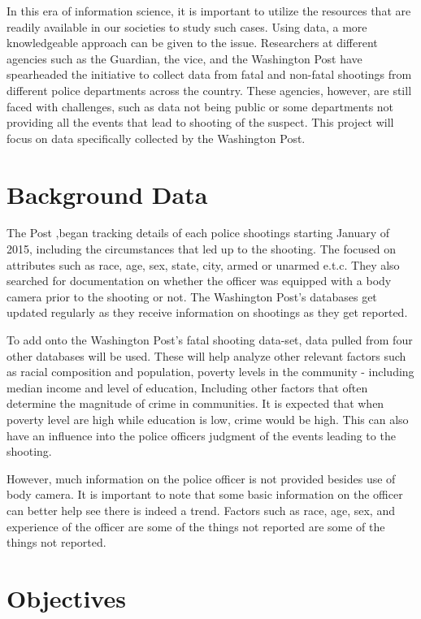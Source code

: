 \documentclass[a4paper,12pt]{scrartcl}
\begin{document}
In this era of information science, it is important to utilize the resources that are readily available in our societies to study such cases. Using data, a more knowledgeable approach can be given to the issue. Researchers at different agencies such as the Guardian, the vice, and the Washington Post have spearheaded the initiative to collect data from fatal and non-fatal shootings from different police departments across the country. These agencies, however, are still faced with challenges, such as data not being public or some departments not providing all the events that lead to shooting of the suspect. This project will focus on data specifically collected by the Washington Post\cite{fatal_force}. 

\section*{Background Data}

The Post \cite{washington_post},began tracking details of each police shootings starting January of 2015, including the circumstances that led up to the shooting. The focused on attributes such as race, age, sex, state, city, armed or unarmed e.t.c. They also searched for documentation on whether the officer was equipped with a body camera prior to the shooting or not. The Washington Post's databases get updated regularly as they receive information on shootings as they get reported.

To add onto the Washington Post's fatal shooting data-set, data pulled from four other databases will be used. These will help analyze other relevant factors such as racial composition and population, poverty levels in the community - including median income and level of education, Including other factors that often determine the magnitude of crime in communities. It is expected that when poverty level are high while education is low, crime would be high. This can also have an influence into the police officers judgment of the events leading to the shooting\cite{deadly_force}. 

However, much information on the police officer is not provided besides use of body camera. It is important to note that some basic information on the officer can better help see there is indeed a trend. Factors such as race, age, sex, and experience of the officer are some of the things not reported are some of the things not reported.

\section*{Objectives}
\end{document}
